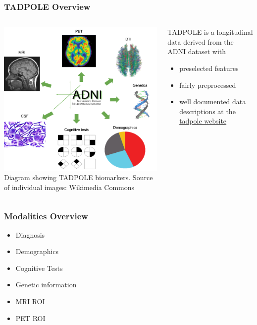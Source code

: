 \documentclass{beamer}
\begin{document}
    \begin{frame}
        \frametitle{TADPOLE Overview}
        \begin{columns}
        \begin{column}{0.5\textwidth}
            \includegraphics[width=\textwidth]{images/tadpoleoverview.png}
            \\
            Diagram showing TADPOLE biomarkers. Source of individual images: Wikimedia Commons
        \end{column}
        \begin{column}{0.5\textwidth}
            TADPOLE is a longitudinal data derived from the ADNI dataset with
            \begin{itemize}
                \item preselected features
                \item fairly preprocessed
                \item well documented data descriptions at the \href{https://tadpole.grand-challenge.org/}{tadpole website}
            \end{itemize}
        \end{column}
        \end{columns}
    \end{frame}

    \begin{frame}
        \frametitle{Modalities Overview}
        \begin{itemize}
            \item Diagnosis
            \item Demographics
            \item Cognitive Tests
            \item Genetic information
            \item MRI ROI
            \item PET ROI
        \end{itemize}
    \end{frame}
\end{document}
